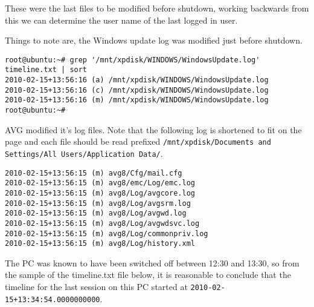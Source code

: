 \documentclass[a4paper,
    11pt,
    normalheadings,
    parindent,
    UKenglish,
    abstracton,
    ]{scrartcl}
\begin{document}
These were the last files to be modified before shutdown, working backwards from this we can determine the user name of the last logged in user.

Things to note are, the Windows update log was modified just before shutdown.
\begin{verbatim}
root@ubuntu:~# grep '/mnt/xpdisk/WINDOWS/WindowsUpdate.log' timeline.txt | sort
2010-02-15+13:56:16 (a) /mnt/xpdisk/WINDOWS/WindowsUpdate.log
2010-02-15+13:56:16 (c) /mnt/xpdisk/WINDOWS/WindowsUpdate.log
2010-02-15+13:56:16 (m) /mnt/xpdisk/WINDOWS/WindowsUpdate.log
root@ubuntu:~#
\end{verbatim}


AVG modified it's log files. Note that the following log is shortened to fit on the page and each file should  be read prefixed \texttt{/mnt/xpdisk/Documents and Settings/All Users/Application Data/}.
\begin{verbatim}
2010-02-15+13:56:15 (m) avg8/Cfg/mail.cfg
2010-02-15+13:56:15 (m) avg8/emc/Log/emc.log
2010-02-15+13:56:15 (m) avg8/Log/avgcore.log
2010-02-15+13:56:15 (m) avg8/Log/avgsrm.log
2010-02-15+13:56:15 (m) avg8/Log/avgwd.log
2010-02-15+13:56:15 (m) avg8/Log/avgwdsvc.log
2010-02-15+13:56:15 (m) avg8/Log/commonpriv.log
2010-02-15+13:56:15 (m) avg8/Log/history.xml
\end{verbatim}


The PC was known to have been switched off between 12:30 and 13:30, so from the sample of the timeline.txt file below, it is reasonable to conclude that the timeline for the last session on this PC started at {\tt 2010-02-15+13:34:54.0000000000}.
\end{document}
